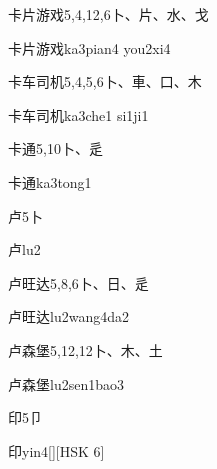 \begin{Entry}{卡片游戏}{5,4,12,6}{⼘、⽚、⽔、⼽}
  \begin{Phonetics}{卡片游戏}{ka3pian4 you2xi4}
  \end{Phonetics}
\end{Entry}

\begin{Entry}{卡车司机}{5,4,5,6}{⼘、⾞、⼝、⽊}
  \begin{Phonetics}{卡车司机}{ka3che1 si1ji1}
  \end{Phonetics}
\end{Entry}

\begin{Entry}{卡通}{5,10}{⼘、⾡}
  \begin{Phonetics}{卡通}{ka3tong1}
  \end{Phonetics}
\end{Entry}

\begin{Entry}{卢}{5}{⼘}
  \begin{Phonetics}{卢}{lu2}
  \end{Phonetics}
\end{Entry}

\begin{Entry}{卢旺达}{5,8,6}{⼘、⽇、⾡}
  \begin{Phonetics}{卢旺达}{lu2wang4da2}
  \end{Phonetics}
\end{Entry}

\begin{Entry}{卢森堡}{5,12,12}{⼘、⽊、⼟}
  \begin{Phonetics}{卢森堡}{lu2sen1bao3}
  \end{Phonetics}
\end{Entry}

\begin{Entry}{印}{5}{⼙}
  \begin{Phonetics}{印}{yin4}[][HSK 6]
  \end{Phonetics}
\end{Entry}

